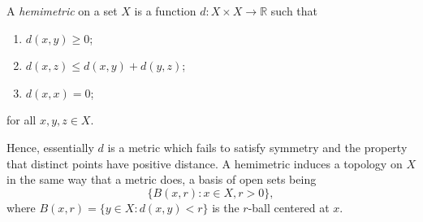 \documentclass[12pt]{article}
\newcommand{\R}{\mathbb{R}}
\begin{document}
A \emph{hemimetric} on a set $X$ is a function
$d\colon X\times X\to \R$ such that
\begin{enumerate}
\item $d(x,y)\geq 0$;
\item $d(x,z) \leq d(x,y) + d(y,z)$;
\item $d(x,x) = 0$;
\end{enumerate}
for all $x,y,z\in X$.

Hence, essentially $d$ is a metric which fails to satisfy symmetry and the property that distinct points have positive distance.
A hemimetric induces a topology on $X$ in the same way that a metric does, a basis of open sets being
$$\{B(x,r): x\in X, r>0\},$$
where $B(x,r)=\{y\in X : d(x,y)<r\}$ is the $r$-ball centered at $x$.
\end{document}
